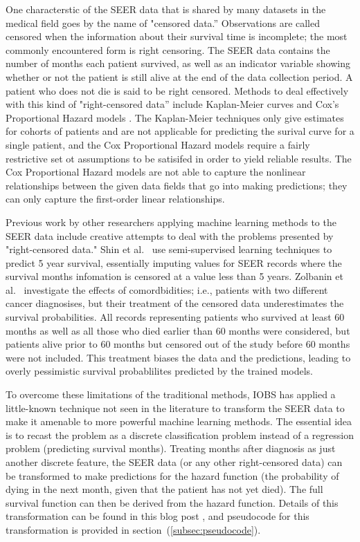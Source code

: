 \documentclass[a4paper,11pt]{article}
\begin{document}
One characterstic of the SEER data that is shared by many datasets in the medical field 
goes by the name of "censored data.'' Observations are called censored when the information about their survival time is incomplete; the most commonly encountered form is right censoring. 
The SEER data contains the number of months each patient survived, as well as an indicator variable showing whether or not the patient is still alive at the end of the data collection period.
A patient who does not die is said to be right censored. 
Methods to deal effectively with this kind of "right-censored data'' include Kaplan-Meier curves
and Cox's Proportional Hazard models \cite{cam}. The Kaplan-Meier techniques only give estimates for cohorts of patients and are not applicable for predicting the surival curve for a single patient, and the Cox Proportional Hazard models require a fairly restrictive set ot assumptions to be satisifed in order to yield reliable results. The Cox Proportional Hazard models are not able to capture the nonlinear relationships between the given data fields that go into making predictions; they can only capture the first-order linear relationships.

Previous work by other researchers applying machine learning methods to the SEER data include creative attempts to deal with the problems presented by  "right-censored data." Shin et al.~\cite{ISI:000337467400005} use semi-supervised learning techniques to predict 5 year survival, essentially imputing values for SEER records where the survival months infomation is censored at a value less than 5 years. Zolbanin et al.~\cite{ISI:000355882700012} investigate the effects of comordbidities; i.e., patients with two different cancer diagnosises, but their treatment of the censored data underestimates the survival probabilities. All records representing patients who survived at least 60 months as well as all those who died earlier than 60 months were considered, but patients alive prior to 60 months but censored out of the study before 60 months were not included. This treatment biases the data and the predictions, leading to overly pessimistic survival probablilites predicted by the trained models.



To overcome these limitations of the traditional methods, IOBS has applied a little-known technique not seen in the literature to transform the SEER data to make it amenable to more powerful machine learning methods. The essential idea is to recast the problem as a discrete classification problem instead of a regression problem (predicting survival months). Treating months after diagnosis as just another discrete feature, the SEER data (or any other right-censored data) can be transformed to make predictions for the hazard function
 (the probability of dying in the next month, given that the patient has not yet died).
The full survival function can then be derived from the hazard function.
Details of this transformation can be found in this blog post \cite{kuhn}, and pseudocode for this transformation is provided in section~(\ref{subsec:pseudocode}).
\end{document}
